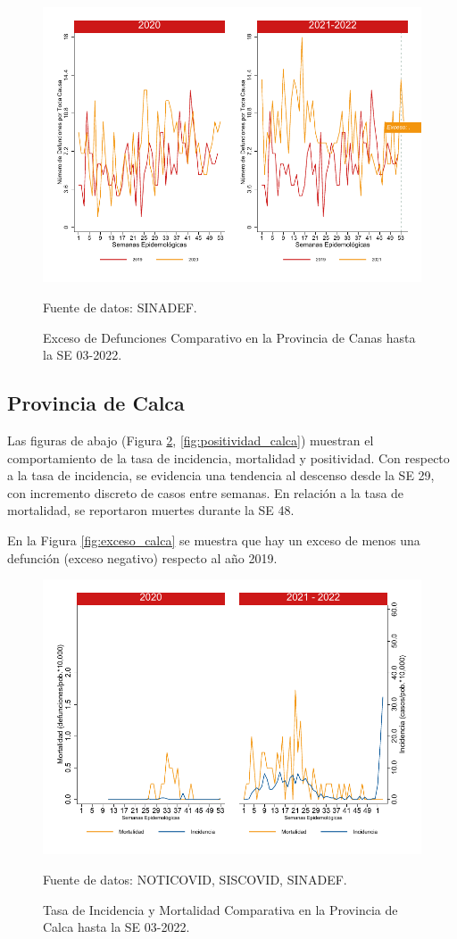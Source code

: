 \documentclass[12pt,a4paper,openany]{book}
\begin{document}
		\begin{figure}[h]
			\caption{Exceso de Defunciones Comparativo en la Provincia de Canas hasta la SE 03-2022.}\label{fig:exceso_canas}
			\begin{center}
				\includegraphics[width=0.7\linewidth]{../figuras/exceso_3}
			\end{center}
			{\footnotesize {Fuente de datos: SINADEF.}}
		\end{figure}
		
		\clearpage
		
		\subsection*{Provincia de Calca}
		\noindent Las figuras de abajo (Figura \ref{fig:inc_mort_calca}, \ref{fig:positividad_calca}) muestran el comportamiento de la tasa de incidencia, mortalidad y  positividad. Con respecto a la tasa de incidencia, se evidencia una tendencia al descenso desde la SE 29, con incremento discreto de casos entre semanas. En relación a la tasa de mortalidad, se reportaron muertes durante la SE 48.
		
		En la Figura \ref{fig:exceso_calca} se muestra que hay un exceso de menos una defunción (exceso negativo) respecto al año 2019.
		
		\begin{figure}[h]
			\caption{Tasa de Incidencia y Mortalidad Comparativa en la Provincia de Calca hasta la SE 03-2022.}\label{fig:inc_mort_calca}
			\begin{center}
				\includegraphics[width=0.7\linewidth]{../figuras/incidencia_mortalidad_20_21_4}
			\end{center}
			{\footnotesize {Fuente de datos: NOTICOVID, SISCOVID, SINADEF.}}
		\end{figure}
		
\end{document}
